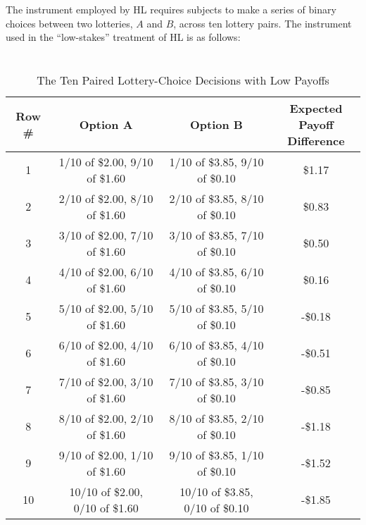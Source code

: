 \documentclass[../main.tex]{subfiles}
\begin{document}
The instrument employed by HL requires subjects to make a series of binary choices between two lotteries, $A$ and $B$, across ten lottery pairs.
The instrument used in the \enquote{low-stakes} treatment of HL is as follows:

\begin{table}[h!]
	\caption{ \textcite{Holt2002} \\ The Ten Paired Lottery-Choice Decisions with Low Payoffs }
	\begin{tabularx}{\textwidth}{cccc}
		Row \# & Option A                                    & Option B                                    & \cnline{Expected Payoff\\Difference} \\\hline
		1      & 1/10 of  \${2.00}, 9/10 of \${1.60} & 1/10 of  \${3.85}, 9/10 of \${0.10} &  \${1.17}                        \\
		2      & 2/10 of  \${2.00}, 8/10 of \${1.60} & 2/10 of  \${3.85}, 8/10 of \${0.10} &  \${0.83}                        \\
		3      & 3/10 of  \${2.00}, 7/10 of \${1.60} & 3/10 of  \${3.85}, 7/10 of \${0.10} &  \${0.50}                        \\
		4      & 4/10 of  \${2.00}, 6/10 of \${1.60} & 4/10 of  \${3.85}, 6/10 of \${0.10} &  \${0.16}                        \\
		5      & 5/10 of  \${2.00}, 5/10 of \${1.60} & 5/10 of  \${3.85}, 5/10 of \${0.10} & -\${0.18}                        \\
		6      & 6/10 of  \${2.00}, 4/10 of \${1.60} & 6/10 of  \${3.85}, 4/10 of \${0.10} & -\${0.51}                        \\
		7      & 7/10 of  \${2.00}, 3/10 of \${1.60} & 7/10 of  \${3.85}, 3/10 of \${0.10} & -\${0.85}                        \\
		8      & 8/10 of  \${2.00}, 2/10 of \${1.60} & 8/10 of  \${3.85}, 2/10 of \${0.10} & -\${1.18}                        \\
		9      & 9/10 of  \${2.00}, 1/10 of \${1.60} & 9/10 of  \${3.85}, 1/10 of \${0.10} & -\${1.52}                        \\
		10     & 10/10 of \${2.00}, 0/10 of \${1.60} & 10/10 of \${3.85}, 0/10 of \${0.10} & -\${1.85}                        \\\bottomrule
	\end{tabularx}
\end{table}
\end{document}
